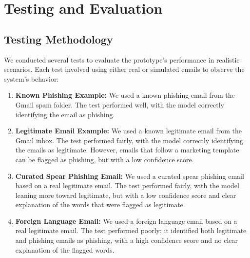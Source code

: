 \documentclass{article}
\begin{document}
\section{Testing and Evaluation}

\subsection{Testing Methodology}
We conducted several tests to evaluate the prototype’s performance in realistic scenarios. Each test involved using either real or simulated emails to observe the system's behavior:
\begin{enumerate}
    \item \textbf{Known Phishing Example:}
    We used a known phishing email from the Gmail spam folder. The test performed well, with the model correctly identifying the email as phishing.
    \item \textbf{Legitimate Email Example:}
    We used a known legitimate email from the Gmail inbox. The test performed fairly, with the model correctly identifying the emails as legitimate. However, emails that follow a marketing template can be flagged as phishing, but with a low confidence score.
    \item \textbf{Curated Spear Phishing Email:}
    We used a curated spear phishing email based on a real legitimate email. The test performed fairly, with the model leaning more toward legitimate, but with a low confidence score and clear explanation of the words that were flagged as legitimate.
    \item \textbf{Foreign Language Email:}
    We used a foreign language email based on a real legitimate email. The test performed poorly; it identified both legitimate and phishing emails as phishing, with a high confidence score and no clear explanation of the flagged words.
\end{enumerate}
\end{document}
